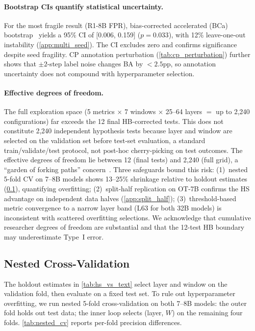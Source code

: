 \paragraph{Bootstrap CIs quantify statistical uncertainty.}
For the most fragile result (R1-8B FPR), bias-corrected accelerated (BCa) bootstrap~\citep{efron1993bootstrap,carpenter2000bootstrap} yields a 95\% CI of [0.006, 0.159] ($p{=}0.033$), with 12\% leave-one-out instability (\cref{app:multi_seed}). The CI excludes zero and confirms significance despite seed fragility. CP annotation perturbation (\cref{tab:cp_perturbation}) further shows that $\pm 2$-step label noise changes BA by ${<}2.5$pp, so annotation uncertainty does not compound with hyperparameter selection.

\paragraph{Effective degrees of freedom.}
The full exploration space (5 metrics $\times$ 7 windows $\times$ 25--64 layers $=$ up to 2{,}240 configurations) far exceeds the 12 final HB-corrected tests. This does not constitute 2{,}240 independent hypothesis tests because layer and window are selected on the validation set before test-set evaluation, a standard train/validate/test protocol, not post-hoc cherry-picking on test outcomes. The effective degrees of freedom lie between 12 (final tests) and 2{,}240 (full grid), a ``garden of forking paths'' concern~\citep{gelman2013garden}. Three safeguards bound this risk: (1)~nested 5-fold CV on 7--8B models shows 13--25\% shrinkage relative to holdout estimates (\cref{app:nested_cv}), quantifying overfitting; (2)~split-half replication on OT-7B confirms the HS advantage on independent data halves (\cref{app:split_half}); (3)~threshold-based metric convergence to a narrow layer band (L63 for both 32B models) is inconsistent with scattered overfitting selections. We acknowledge that cumulative researcher degrees of freedom are substantial and that the 12-test HB boundary may underestimate Type~I error.

\subsection{Nested Cross-Validation}
\label{app:nested_cv}

The holdout estimates in \cref{tab:hs_vs_text} select layer and window on the validation fold, then evaluate on a fixed test set. To rule out hyperparameter overfitting, we run nested 5-fold cross-validation on both 7--8B models: the outer fold holds out test data; the inner loop selects (layer, $W$) on the remaining four folds. \cref{tab:nested_cv} reports per-fold precision differences.

